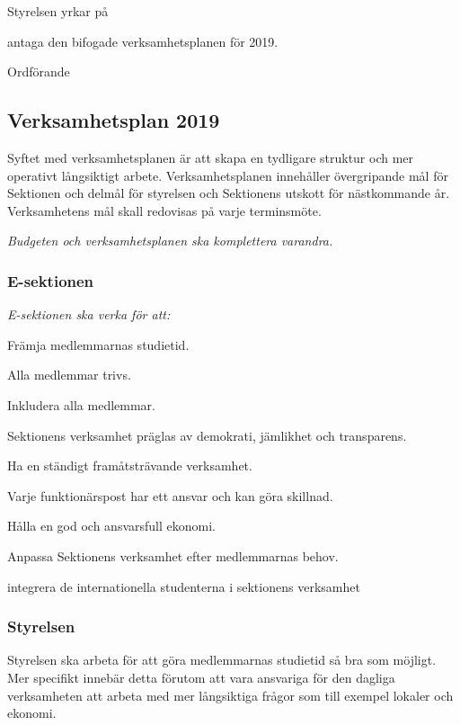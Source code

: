 \documentclass[../_main/handlingar.tex]{subfiles}
\begin{document}

Styrelsen yrkar på

\begin{attsatser}
    \att antaga den bifogade verksamhetsplanen för 2019.
\end{attsatser}

\begin{signatures}{1}
    \ist
    \signature{\ordf}{Ordförande}
\end{signatures}

\subsection*{Verksamhetsplan 2019}
Syftet med verksamhetsplanen är att skapa en tydligare struktur och mer operativt långsiktigt arbete. Verksamhetsplanen innehåller övergripande mål för Sektionen och delmål för styrelsen och Sektionens utskott för nästkommande år. Verksamhetens mål skall redovisas på varje terminsmöte.

\emph{Budgeten och verksamhetsplanen ska komplettera varandra.}

\subsubsection*{E-sektionen}
\emph{E-sektionen ska verka för att:}
\begin{dashlist}
    \item Främja medlemmarnas studietid. 
    \item Alla medlemmar trivs.
    \item Inkludera alla medlemmar. 
    \item Sektionens verksamhet präglas av demokrati, jämlikhet och transparens.
    \item Ha en ständigt framåtsträvande verksamhet. 
    \item Varje funktionärspost har ett ansvar och kan göra skillnad. 
    \item Hålla en god och ansvarsfull ekonomi. 
    \item Anpassa Sektionens verksamhet efter medlemmarnas behov.
    \item integrera de internationella studenterna i sektionens verksamhet
\end{dashlist}

\subsubsection*{Styrelsen}
Styrelsen ska arbeta för att göra medlemmarnas studietid så bra som möjligt. Mer specifikt innebär detta förutom att vara ansvariga för den dagliga verksamheten att arbeta med mer långsiktiga frågor som till exempel lokaler och ekonomi. 
\end{document}
